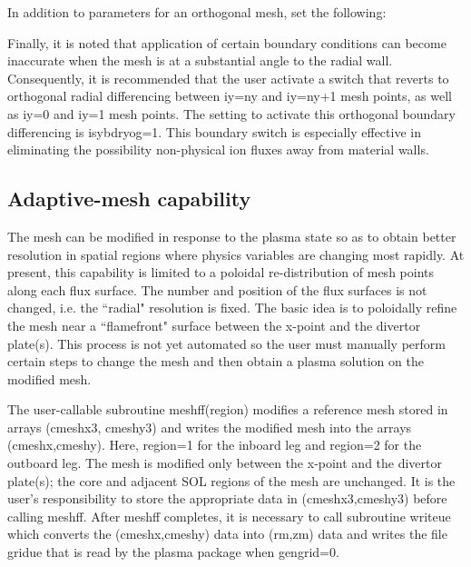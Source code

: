 \documentclass [12pt]{article}
\def\hsa{\hskip.4truein}
\def\hsp6{\hskip.6truein}
\begin{document}
\noindent
In addition to parameters for an orthogonal mesh, set the following:
{\sf
{}
}

Finally, it is noted that application of certain boundary conditions can
become inaccurate when the mesh is at a substantial angle to the radial wall.
Consequently, it is recommended that the user activate a switch that reverts
to orthogonal radial differencing between iy=ny and iy=ny+1 mesh points, as
well as iy=0 and iy=1 mesh points. The setting to activate this orthogonal
boundary differencing is {\sf isybdryog=1}.  This boundary switch is
especially effective in eliminating the possibility non-physical ion fluxes
away from material walls.

\subsection{Adaptive-mesh capability}

The mesh can be modified in response to the plasma state so as to
obtain better resolution in spatial regions where physics variables
are changing most rapidly.  At present, this capability is limited to
a poloidal re-distribution of mesh points along each flux surface.
The number and position of the flux surfaces is not changed, i.e. the
``radial" resolution is fixed.  The basic idea is to poloidally refine
the mesh near a ``flamefront" surface between the x-point and the
divertor plate(s).  This process is not yet automated so the user
must manually perform certain steps to change the mesh and then obtain
a plasma solution on the modified mesh.

The user-callable subroutine meshff(region) modifies a reference mesh
stored in arrays (cmeshx3, cmeshy3) and writes the modified mesh into
the arrays (cmeshx,cmeshy).  Here, region=1 for the inboard leg and
region=2 for the outboard leg.  The mesh is modified only between the
x-point and the divertor plate(s); the core and adjacent SOL regions
of the mesh are unchanged.  It is the user's responsibility to store
the appropriate data in (cmeshx3,cmeshy3) before calling meshff.  
After meshff completes, it is necessary to call subroutine writeue
which converts the (cmeshx,cmeshy) data into (rm,zm) data and writes
the file {\sf gridue} that is read by the plasma package when gengrid=0.
\end{document}
